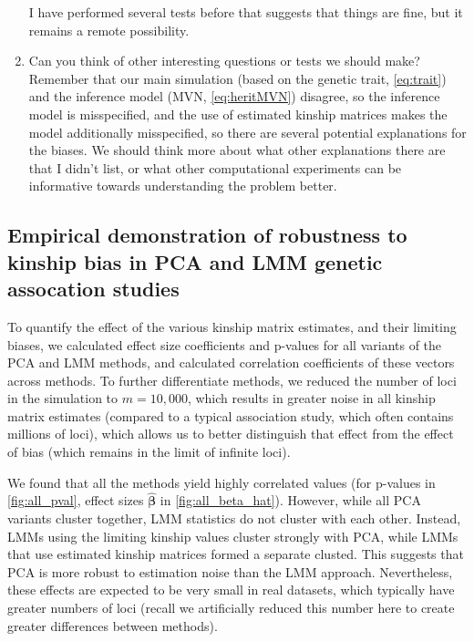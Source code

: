 \documentclass[11pt]{article}
\begin{document}
\begin{enumerate}
  I have performed several tests before that suggests that things are fine, but it remains a remote possibility.
\item Can you think of other interesting questions or tests we should make?
  Remember that our main simulation (based on the genetic trait, \cref{eq:trait}) and the inference model (MVN, \cref{eq:heritMVN}) disagree, so the inference model is misspecified, and the use of estimated kinship matrices makes the model additionally misspecified, so there are several potential explanations for the biases.
  We should think more about what other explanations there are that I didn't list, or what other computational experiments can be informative towards understanding the problem better.
\end{enumerate}

\subsection{Empirical demonstration of robustness to kinship bias in PCA and LMM genetic assocation studies}

To quantify the effect of the various kinship matrix estimates, and their limiting biases, we calculated effect size coefficients and p-values for all variants of the PCA and LMM methods, and calculated correlation coefficients of these vectors across methods.
To further differentiate methods, we reduced the number of loci in the simulation to $m=10,000$, which results in greater noise in all kinship matrix estimates (compared to a typical association study, which often contains millions of loci), which allows us to better distinguish that effect from the effect of bias (which remains in the limit of infinite loci).

We found that all the methods yield highly correlated values (for p-values in \cref{fig:all_pval}, effect sizes $\hat{\mathbf{\beta}}$ in \cref{fig:all_beta_hat}).
However, while all PCA variants cluster together, LMM statistics do not cluster with each other.
Instead, LMMs using the limiting kinship values cluster strongly with PCA, while LMMs that use estimated kinship matrices formed a separate clusted.
This suggests that PCA is more robust to estimation noise than the LMM approach.
Nevertheless, these effects are expected to be very small in real datasets, which typically have greater numbers of loci (recall we artificially reduced this number here to create greater differences between methods).
\end{document}
